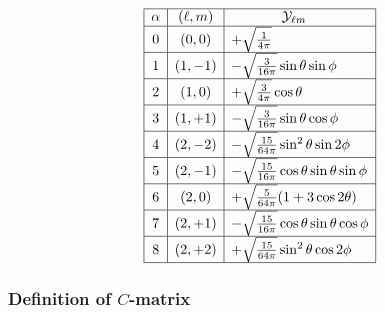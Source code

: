 \documentclass[letterpaper]{article}
\newcommand{\YY}{\mc Y}
\begin{document}
$$\begin{array}{|c|c|l|}\hline
\alpha & (\ell, m) & \hspace{0.5in} \YY_{\ell m}          \\\hline
0      & (   0, 0) & +\sqrt\frac{1}{4\pi} \\\hline
1      & (   1,-1) & -\sqrt{\frac{3}{16\pi}} \sin\theta\sin\phi  \\\hline
2      & (   1, 0) & +\sqrt\frac{3}{4\pi} \cos\theta          \\\hline
3      & (   1,+1) & -\sqrt{\frac{3}{16\pi}} \sin\theta\cos\phi  \\\hline 
4      & (   2,-2) & -\sqrt\frac{15}{64\pi} \sin^2\theta \sin 2\phi \\ \hline
5      & (   2,-1) & -\sqrt\frac{15}{16\pi} \cos\theta \sin\theta \sin\phi \\ \hline
6      & (   2, 0) & +\sqrt\frac{5}{64\pi}(1+3\cos 2\theta) \\ \hline
7      & (   2,+1) & -\sqrt\frac{15}{16\pi} \cos\theta \sin\theta \cos\phi \\ \hline
8      & (   2,+2) & +\sqrt\frac{15}{64\pi} \sin^2\theta \cos 2\phi \\ \hline
\end{array}$$
\renewcommand{\arraystretch}{1.0}

\subsubsection*{Definition of $C$-matrix}
\end{document}
